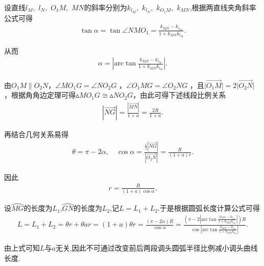 \documentclass{cumcmthesis}
\begin{document}
\par 设直线$l_M,$ $l_N,$ $O_1M,$ $MN$的斜率分别为$k_{l_M},$ $k_{l_N},$ $k_{O_1M},$ $k_{MN}$,根据两直线夹角斜率公式可得
\begin{align}\label{1.........36}
\tan \alpha =\tan \angle NMO_1=\frac{k_{MN}-k_{l_M}}{1+k_{MN}k_{l_M}}.
\end{align}
\par 从而
\begin{align}\label{1.........37}
\alpha =\left| \mathrm{arc}\tan \frac{k_{MN}-k_{l_M}}{1+k_{MN}k_{l_M}} \right|.
\end{align}
\par 由\(O_1M\parallel O_2N\)，\(\angle MO_1G=\angle NO_2G\) ，\(\angle O_1MG=\angle O_2NG\) ，且\(\vert\overrightarrow{O_1M}\vert = 2\vert\overrightarrow{O_2N}\vert\) ，根据角角边定理可得$\vartriangle MO_1G\cong \vartriangle NO_2G$，由此可得下述线段比例关系
\begin{align}\label{1.........38}
\left| \overrightarrow{NG} \right|=\frac{\left| \overrightarrow{MN} \right|}{1+a}=\frac{2R}{1+a}.
\end{align}
\par 再结合几何关系易得
\begin{align}\label{1.........39}
\theta =\pi -2\alpha ,\quad \cos \alpha =\frac{\frac{1}{2}\left| \overrightarrow{NG} \right|}{\left| \overrightarrow{O_2N} \right|}=\frac{R}{\left( 1+a \right) r}.
\end{align}
\par 因此
\begin{align}\label{1.........40}
r=\frac{R}{\left( 1+a \right) \cos \alpha}.
\end{align}
\par 设$\wideparen{MG}$的长度为$L_1$,$\wideparen{GN}$的长度为$L_2$,记$L=L_1+L_2$.于是根据圆弧长度计算公式可得
\begin{align}\label{equation-1}
L=L_1+L_2=\theta r+\theta ar=\left( 1+a \right) \theta r=\frac{\left( \pi -2\alpha \right) R}{\cos \alpha}=\frac{\left( \pi -2\left| \mathrm{arc}\tan \frac{k_{MN}-k_{l_M}}{1+k_{MN}k_{l_M}} \right| \right) R}{\cos \left| \mathrm{arc}\tan \frac{k_{MN}-k_{l_M}}{1+k_{MN}k_{l_M}} \right|}.
\end{align}
\par 由上式可知$L$与$a$无关,因此不可通过改变前后两段调头圆弧半径比例减小调头曲线长度.
\end{document}
